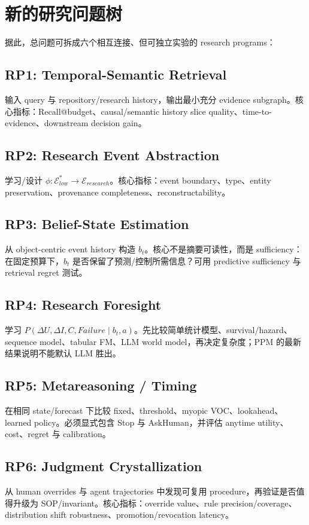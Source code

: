 \documentclass[11pt,a4paper]{ctexart}
\begin{document}
\section{新的研究问题树}

据此，总问题可拆成六个相互连接、但可独立实验的 research programs：

\subsection*{RP1: Temporal-Semantic Retrieval}
输入 query 与 repository/research history，输出最小充分 evidence subgraph。核心指标：Recall@budget、causal/semantic history slice quality、time-to-evidence、downstream decision gain。

\subsection*{RP2: Research Event Abstraction}
学习/设计 $\phi:\mathcal E_{low}^{*}\to\mathcal E_{research}$。核心指标：event boundary、type、entity preservation、provenance completeness、reconstructability。

\subsection*{RP3: Belief-State Estimation}
从 object-centric event history 构造 $b_t$。核心不是摘要可读性，而是 sufficiency：在固定预算下，$b_t$ 是否保留了预测/控制所需信息？可用 predictive sufficiency 与 retrieval regret 测试。

\subsection*{RP4: Research Foresight}
学习 $P(\Delta U,\Delta I,C,Failure\mid b_t,a)$。先比较简单统计模型、survival/hazard、sequence model、tabular FM、LLM world model，再决定复杂度；PPM 的最新结果说明不能默认 LLM 胜出\cite{fertig2026ppm}。

\subsection*{RP5: Metareasoning / Timing}
在相同 state/forecast 下比较 fixed、threshold、myopic VOC、lookahead、learned policy。必须显式包含 Stop 与 AskHuman，并评估 anytime utility、cost、regret 与 calibration。

\subsection*{RP6: Judgment Crystallization}
从 human overrides 与 agent trajectories 中发现可复用 procedure，再验证是否值得升级为 SOP/invariant。核心指标：override value、rule precision/coverage、distribution shift robustness、promotion/revocation latency。
\end{document}
